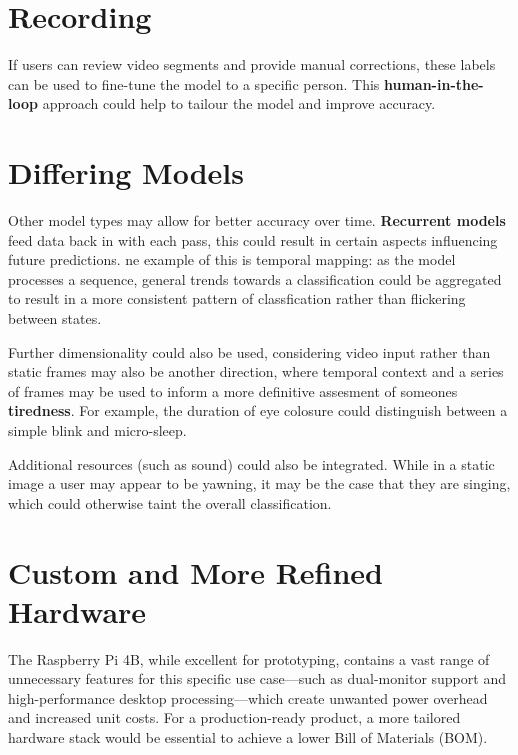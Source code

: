 \section{Recording}
If users can review video segments and provide manual corrections, these labels can be used to fine-tune the model to a 
specific person. This \textbf{human-in-the-loop} approach could help to tailour the model and improve accuracy.




\section{Differing Models}
Other model types may allow for better accuracy over time. \textbf{Recurrent models} feed data back in with each pass, this could
result in certain aspects influencing future predictions. ne example of this is temporal mapping: as
the model processes a sequence, general trends towards a classification could be aggregated to result in a more consistent pattern
of classfication rather than flickering between states.

Further dimensionality could also be used, considering video input rather than static frames may also be another direction, where
temporal context and a series of frames may be used to inform a more definitive assesment of someones \textbf{tiredness}. For example,
the duration of eye colosure could distinguish between a simple blink and micro-sleep.

Additional resources (such as sound) could also be integrated. While in a static image a user may appear to be yawning, it may be the
case that they are singing, which could otherwise taint the overall classification.



\section{Custom and More Refined Hardware}
The Raspberry Pi 4B, while excellent for prototyping, contains a vast range of unnecessary features for this specific use
case—such as dual-monitor support and high-performance desktop processing—which create unwanted power overhead and increased
unit costs. For a production-ready product, a more tailored hardware stack would be essential to achieve a lower Bill of Materials (BOM).


